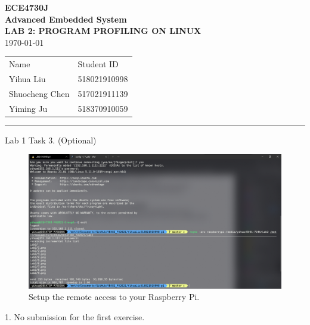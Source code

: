 \documentclass[a4paper]{article}
\begin{document}
\begin{center}
    \huge
    \textbf{ECE4730J\\Advanced Embedded System\\}
    \Large
    \vspace{15pt}
    \uppercase{\textbf{Lab 2: Program Profiling on Linux}}\\
    \large
    \vspace{5pt}\today\\
    \vspace{5pt}
    \begin{tabular}{ll}
        Name&Student ID\\
        Yihua Liu&518021910998\\
        Shuocheng Chen&517021911139\\
        Yiming Ju&518370910059\\
    \end{tabular}
    \vspace{5pt}
    \rule[-5pt]{.97\linewidth}{0.05em}
\end{center}
Lab 1 Task 3. (Optional)
\begin{figure}[H]
    \centering
    \includegraphics[width=1\textwidth]{0.png}
    \caption{Setup the remote access to your Raspberry Pi.}
\end{figure}
1. No submission for the first exercise.
\end{document}
